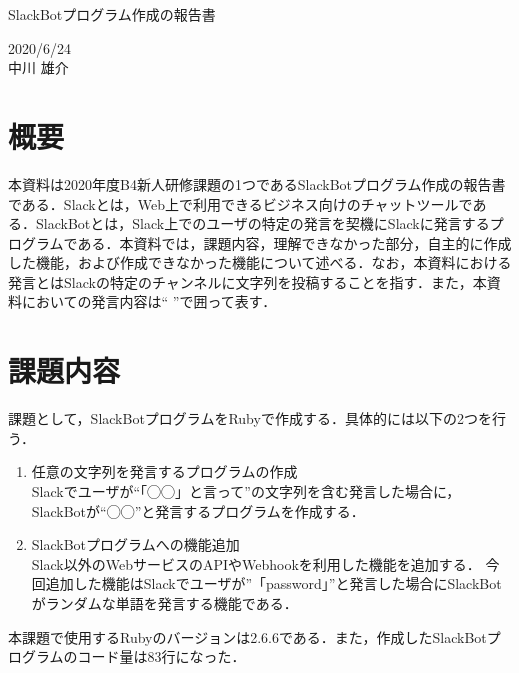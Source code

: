 \documentclass[12pt]{jsarticle}
\begin{document}
\begin{center}
{\LARGE SlackBotプログラム作成の報告書}
\end{center}

\begin{flushright}
  2020/6/24\\
  中川 雄介
\end{flushright}
\section{概要}\label{sec1}
\label{sec:introduction}
本資料は2020年度B4新人研修課題の1つであるSlackBotプログラム作成の報告書である．Slackとは，Web上で利用できるビジネス向けのチャットツールである．SlackBotとは，Slack上でのユーザの特定の発言を契機にSlackに発言するプログラムである．本資料では，課題内容，理解できなかった部分，自主的に作成した機能，および作成できなかった機能について述べる．なお，本資料における発言とはSlackの特定のチャンネルに文字列を投稿することを指す．また，本資料においての発言内容は`` ''で囲って表す．

\section{課題内容}\label{sec2}
課題として，SlackBotプログラムをRubyで作成する．具体的には以下の2つを行う．
\begin{enumerate}
\item 任意の文字列を発言するプログラムの作成\\
  Slackでユーザが``「◯◯」と言って''の文字列を含む発言した場合に，SlackBotが``◯◯''と発言するプログラムを作成する．\label{item1}
\item SlackBotプログラムへの機能追加\\
  Slack以外のWebサービスのAPIやWebhookを利用した機能を追加する．\label{item2}
  今回追加した機能はSlackでユーザが''「password」''と発言した場合にSlackBotがランダムな単語を発言する機能である．
\end{enumerate}
本課題で使用するRubyのバージョンは2.6.6である．また，作成したSlackBotプログラムのコード量は83行になった．
\end{document}
